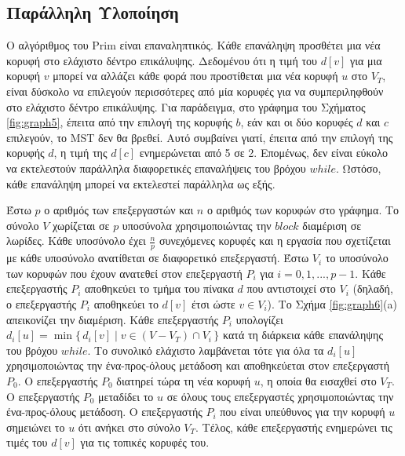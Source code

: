 \documentclass[12pt,a4paper]{article}
\begin{document}
\subsection*{Παράλληλη Υλοποίηση}
Ο αλγόριθμος του \foreignlanguage{english}{Prim} είναι επαναληπτικός. Κάθε επανάληψη προσθέτει μια νέα κορυφή στο ελάχιστο δέντρο επικάλυψης. Δεδομένου ότι η τιμή του $d[v]$ για μια κορυφή $v$ μπορεί να αλλάζει κάθε φορά που προστίθεται μια νέα κορυφή $u$ στο $V_T$, είναι δύσκολο να επιλεγούν περισσότερες από μία κορυφές για να συμπεριληφθούν στο ελάχιστο δέντρο επικάλυψης. Για παράδειγμα, στο γράφημα του Σχήματος \ref{fig:graph5}, έπειτα από την επιλογή της κορυφής $b$, εάν και οι δύο κορυφές $d$ και $c$ επιλεγούν, το \foreignlanguage{english}{MST} δεν θα βρεθεί. Αυτό συμβαίνει γιατί, έπειτα από την επιλογή της κορυφής $d$, η τιμή της $d[c]$ ενημερώνεται από 5 σε 2. Επομένως, δεν είναι εύκολο να εκτελεστούν παράλληλα διαφορετικές επαναλήψεις του βρόχου $while$. Ωστόσο, κάθε επανάληψη μπορεί να εκτελεστεί παράλληλα ως εξής. 

Έστω $p$ ο αριθμός των επεξεργαστών και $n$ ο αριθμός των κορυφών στο γράφημα. Το σύνολο $V$ χωρίζεται σε $p$ υποσύνολα χρησιμοποιώντας την $block$ διαμέριση σε λωρίδες. Κάθε υποσύνολο έχει $\frac{n}{p}$ συνεχόμενες κορυφές και η εργασία που σχετίζεται με κάθε υποσύνολο ανατίθεται σε διαφορετικό επεξεργαστή. Έστω $V_i$ το υποσύνολο των κορυφών που έχουν ανατεθεί στον επεξεργαστή $P_i$ για $i = 0, 1, ..., p - 1$. Κάθε επεξεργαστής $P_i$ αποθηκεύει το τμήμα του πίνακα $d$ που αντιστοιχεί στο $V_i$ (δηλαδή, ο επεξεργαστής $P_i$ αποθηκεύει το $d[v]$ έτσι ώστε $v \in V_i$). Το Σχήμα \ref{fig:graph6}(a) απεικονίζει την διαμέριση. Κάθε επεξεργαστής $P_i$ υπολογίζει $d_i[u] = \min \{\, d_i[v] \mid v \in (V - V_T) \cap V_i \,\}$ κατά τη διάρκεια κάθε επανάληψης του βρόχου $while$. Το συνολικό ελάχιστο λαμβάνεται τότε για όλα τα $d_i[u]$ χρησιμοποιώντας την ένα-προς-όλους μετάδοση και αποθηκεύεται στον επεξεργαστή $P_0$. Ο επεξεργαστής $P_0$ διατηρεί τώρα τη νέα κορυφή $u$, η οποία θα εισαχθεί στο $V_T$. Ο επεξεργαστής $P_0$ μεταδίδει το $u$ σε όλους τους επεξεργαστές χρησιμοποιώντας την ένα-προς-όλους μετάδοση. Ο επεξεργαστής $P_i$ που είναι υπεύθυνος για την κορυφή $u$ σημειώνει το $u$ ότι ανήκει στο σύνολο $V_T$. Τέλος, κάθε επεξεργαστής ενημερώνει τις τιμές του $d[v]$ για τις τοπικές κορυφές του. 
\end{document}
